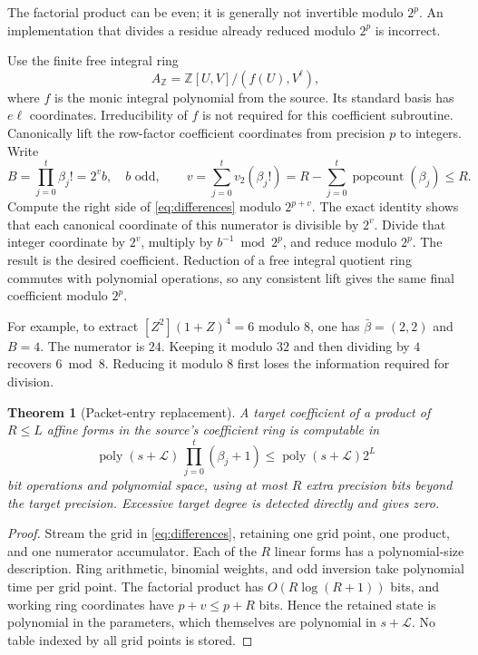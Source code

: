 \documentclass[11pt]{article}
\newtheorem{theorem}{Theorem}[section]
\theoremstyle{remark}
\newcommand{\poly}{\operatorname{poly}}
\newcommand{\vTwo}{v_2}
\newcommand{\LL}{\mathcal L}
\begin{document}
The factorial product can be even; it is generally not invertible modulo $2^p$. An implementation that divides a residue already reduced modulo $2^p$ is incorrect.

Use the finite free integral ring
\[
 A_{\mathbb Z}=\mathbb Z[U,V]/(f(U),V^\ell),
\]
where $f$ is the monic integral polynomial from the source. Its standard basis has $e\ell$ coordinates. Irreducibility of $f$ is not required for this coefficient subroutine. Canonically lift the row-factor coefficient coordinates from precision $p$ to integers. Write
\[
 B=\prod_{j=0}^t\beta_j!=2^v b,\quad b\text{ odd},\qquad
 v=\sum_{j=0}^t\vTwo(\beta_j!)
   =R-\sum_{j=0}^t\operatorname{popcount}(\beta_j)\le R.
\]
Compute the right side of \eqref{eq:differences} modulo $2^{p+v}$. The exact identity shows that each canonical coordinate of this numerator is divisible by $2^v$. Divide that integer coordinate by $2^v$, multiply by $b^{-1}\bmod 2^p$, and reduce modulo $2^p$. The result is the desired coefficient. Reduction of a free integral quotient ring commutes with polynomial operations, so any consistent lift gives the same final coefficient modulo $2^p$.

For example, to extract $[Z^2](1+Z)^4=6$ modulo $8$, one has $\bar\beta=(2,2)$ and $B=4$. The numerator is $24$. Keeping it modulo $32$ and then dividing by $4$ recovers $6\bmod8$. Reducing it modulo $8$ first loses the information required for division.

\begin{theorem}[Packet-entry replacement]
\label{thm:packet}
A target coefficient of a product of $R\le L$ affine forms in the source's coefficient ring is computable in
\[
 \poly(s+\LL)\,\prod_{j=0}^t(\beta_j+1)
 \le\poly(s+\LL)2^L
\]
bit operations and polynomial space, using at most $R$ extra precision bits beyond the target precision. Excessive target degree is detected directly and gives zero.
\end{theorem}
\begin{proof}
Stream the grid in \eqref{eq:differences}, retaining one grid point, one product, and one numerator accumulator. Each of the $R$ linear forms has a polynomial-size description. Ring arithmetic, binomial weights, and odd inversion take polynomial time per grid point. The factorial product has $O(R\log(R+1))$ bits, and working ring coordinates have $p+v\le p+R$ bits. Hence the retained state is polynomial in the parameters, which themselves are polynomial in $s+\LL$. No table indexed by all grid points is stored.
\end{proof}
\end{document}
